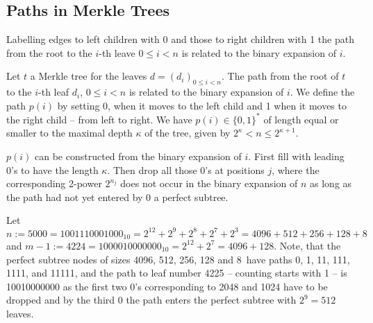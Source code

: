 \subsection{Paths in Merkle Trees}
Labelling edges to left children with 0 and those to right children
with 1 the path from the root to the \(i\)-th leave \(0 \le i < n\)
is related to the binary expansion of \(i\).

%

\begin{lemma}
Let \(t\) a Merkle tree for the leaves \(d = (d_i)_{0 \le i < n}\). The path from 
the root of \(t\) to the \(i\)-th leaf \(d_i\), \(0 \le i < n\) is related
to the binary expansion of \(i\). We define the path \(p(i)\) by 
setting 0, when it moves to the left child and 1 when it moves to the
right child -- from left to right. We have
\(p(i) \in \{0,1\}^\ast\) of length equal or smaller to the maximal depth 
\(\kappa\) of the tree, given by 
\(2^\kappa < n \le 2^{\kappa+1}\).

\(p(i)\) can be constructed from the binary expansion of \(i\). First
fill with leading 0's to have the length \(\kappa\). Then drop
all those 0's at positions \(j\), where the corresponding 2-power \(2^{n_j}\)
does not occur in the binary expansion of \(n\) as long as
the path had not yet entered by 0 a perfect subtree.
\end{lemma}

\begin{example}
Let \(n := 5000 = 1001110001000_{10} = 2^{12}+2^9+2^8+2^7+2^3 = 4096 + 512 + 256 + 128 + 8\)
and \(m-1 := 4224 = 1000010000000_{10} = 2^{12} + 2^7 = 4096 + 128\).
Note, that the perfect subtree nodes of sizes 4096, 512, 256, 128 and 8\ have paths 0, 1, 
11, 111, 1111, and 11111, and the path to leaf number 4225 -- counting starts with 1 --
is 10010000000 as the first two 0's corresponding to 2048 and 1024 have to be dropped
and by the third 0 the path enters the perfect subtree with \(2^9 = 512\) leaves.
\end{example}


